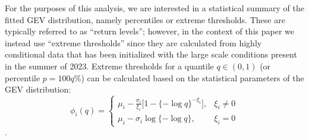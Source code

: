 \documentclass{article}
\begin{document}
For the purposes of this analysis, we are interested in a statistical summary of the fitted GEV distribution, namely percentiles or extreme thresholds. These are typically referred to as ``return levels''; however, in the context of this paper we instead use ``extreme thresholds'' since they are calculated from highly conditional data that has been initialized with the large scale conditions present in the summer of 2023. Extreme thresholds for a quantile $q \in (0,1)$ (or percentile $p = 100q \%$) can be calculated based on the statistical parameters of the GEV distribution:
\begin{equation} \label{eq:returnVal}
    \phi_{i}(q) = \left\{ \begin{array}{ll}
    \mu_i - \frac{\sigma_i}{\xi_i}\big[1 - \{-\log q\}^{-\xi_i}\big],  & \xi_i \neq 0 \\[1ex]
    \mu_i - \sigma_i \log\{-\log q\},  & \xi_i = 0
    \end{array} \right. 
\end{equation}
\citep{Coles2001}. 


\end{document}
